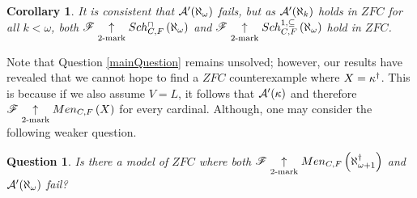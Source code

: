 \documentclass{amsart}
\theoremstyle{plain}
\newtheorem{corollary}[theorem]{Corollary}
\newtheorem{question}[theorem]{Question}
\theoremstyle{definition}
\theoremstyle{remark}
\theoremstyle{plain}
\theoremstyle{definition}
\theoremstyle{remark}
\begin{document}

  \begin{corollary}
    It is consistent that \(\mathcal{A}'(\aleph_\omega)\) fails,
    but as \(\mathcal{A}'(\aleph_k)\) holds in \(ZFC\) for all \(k<\omega\),
    both
    \(\mathscr{F}\underset{2\text{-mark}}{\uparrow}Sch^{\cap}_{C,F}\left({\aleph_\omega}\right)\) and
    \(\mathscr{F}\underset{2\text{-mark}}{\uparrow}Sch^{1,\subseteq}_{C,F}\left({\aleph_\omega}\right)\) hold in \(ZFC\).
  \end{corollary}

  Note that Question \ref{mainQuestion} remains unsolved; however,
  our results have revealed that we cannot hope to find a \(ZFC\)
  counterexample where \(X=\kappa^\dagger\). This is
  because if we also assume \(V=L\), it follows that
  \(\mathcal{A}'(\kappa)\) and therefore \(\mathscr{F}\underset{2\text{-mark}}{\uparrow}Men_{C,F}\left({X}\right)\)
  for every cardinal. Although, one may consider the following weaker question.

  \begin{question}
    Is there a model of \(ZFC\) where both
    \(\mathscr{F}\underset{2\text{-mark}}{\uparrow}Men_{C,F}\left({\aleph_{\omega+1}^\dagger}\right)\) and
    \(\mathcal{A}'(\aleph_\omega)\) fail?
  \end{question}








\end{document}
